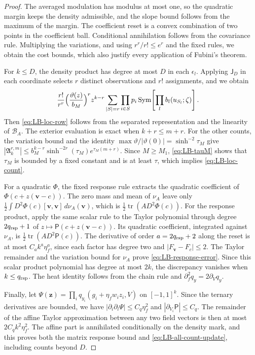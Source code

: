 \begin{proof}
The averaged modulation has modulus at most one, so the quadratic
margin keeps the density admissible, and the slope bound follows from
the maximum of the margin. The coefficient reset is a convex combination of two points in the
coefficient ball. Conditional
annihilation follows from the covariance rule. Multiplying the
variations, and using $r^r/r!\le e^r$ and the fixed rules, we obtain
the cost bounds, which also justify every application of Fubini's
theorem.

For $k\le D$, the density product has degree at most $D$ in each
$\epsilon_l$. Applying $\mathsf J_D$ in each coordinate selects
$r$ distinct observations and $r!$ assignments, and we obtain
\[
 \frac{r!}{r^r}\Bigl(\frac{\vartheta(z)}{b_M}\Bigr)^rz^{k-r}
 \sum_{|S|=r}\prod_{i\in S}p_i
 \operatorname{Sym}\!\left[\prod_l b_l(u_{S_l};\zeta)\right].
\]
Then \eqref{eq:LB-loc-row} follows from the separated
representation and the linearity of $\mathcal B_A$. The exterior
evaluation is exact when $k+r\le m+r$. For the other counts, the
variation bound and the identity
$\max\vartheta/|\vartheta(0)|=\sinh^{-2}\tau_M$ give
$|\mathfrak A_k^{r,m}|\le b_M^{k-r}\sinh^{-2r}(\tau_M)e^{\tau_M(m+r)}$.
Since $M\ge M_1$, \eqref{eq:LB-tauM} shows that $\tau_M$ is bounded by a
fixed constant and is at least $\tau$, which implies \eqref{eq:LB-loc-count}.

For a quadratic $\Phi$, the fixed response rule extracts the quadratic
coefficient of $\Phi(c+z(\mathbf v-c))$. The zero mass and mean of
$\nu_A$ leave only
$\tfrac12\int D^2\Phi(c)[\mathbf v,\mathbf v]\,d\nu_A(\mathbf v)$,
which is $\tfrac12\operatorname{tr}(A D^2\Phi(c))$.
For the response product, apply the same scalar rule to the Taylor
polynomial through degree $2q_{\rm rsp}+1$ of
$z\mapsto\mathsf P(c+z(\mathbf v-c))$.
Its quadratic coefficient, integrated against $\nu_A$, is
$\tfrac12\operatorname{tr}(A D^2\mathsf P(c))$.
The derivative of order $a=2q_{\rm rsp}+2$ along the reset is at most
$C_a k^a\eta_f^a$, since each factor has degree two and
$|F_{\mathbf v}-F_c|\le2$. The Taylor remainder and the variation
bound for $\nu_A$ prove \eqref{eq:LB-response-error}.
Since this scalar product polynomial has degree at most $2k$, the
discrepancy vanishes when $k\le q_{\rm rsp}$.
The heat identity follows from the chain rule and
$\partial_f^2q_y=2\partial_Vq_y$.

Finally, let $\Psi(\mathbf z)=\prod_iq_{y_i}(g_i+\eta_fw_i z_i,V)$
on $[-1,1]^k$. Since the ternary derivatives are bounded, we have
$|\partial_i\partial_l\Psi|\le C_q\eta_f^2$ and
$|\partial_{V_i}\mathsf P|\le C_q$. The remainder of the affine Taylor
approximation between any two field vectors is then at most
$2C_qk^2\eta_f^2$. The affine part is annihilated conditionally on the
density mark, and this proves both the matrix response bound and
\eqref{eq:LB-all-count-update}, including counts beyond $D$.
\end{proof}

